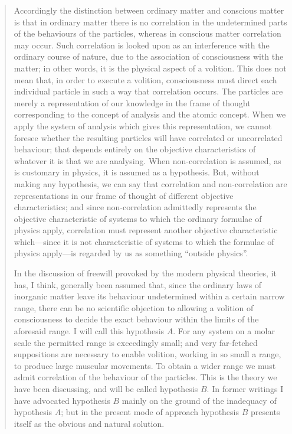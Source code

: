 \documentclass{article}
\begin{document}
\begin{quote}
    Accordingly the distinction between ordinary matter and conscious matter is that in ordinary matter there is no correlation in the undetermined parts of the behaviours of the particles, whereas in conscious matter correlation may occur.  Such correlation is looked upon as an interference with the ordinary course of nature, due to the association of consciousness with the matter; in other words, it is the physical aspect of a volition.  This does not mean that, in order to execute a volition, consciousness must direct each individual particle in such a way that correlation occurs.  The particles are merely a representation of our knowledge in the frame of thought corresponding to the concept of analysis and the atomic concept.  When we apply the system of analysis which gives this representation, we cannot foresee whether the resulting particles will have correlated or uncorrelated behaviour; that depends entirely on the objective characteristics of whatever it is that we are analysing.  When non-correlation is assumed, as is customary in physics, it is assumed as a hypothesis.  But, without making any hypothesis, we can say that correlation and non-correlation are representations in our frame of thought of different objective characteristics; and since non-correlation admittedly represents the objective characteristic of systems to which the ordinary formulae of physics apply, correlation must represent another objective characteristic which---since it is not characteristic of systems to which the formulae of physics apply---is regarded by us as something ``outside physics''.

    In the discussion of freewill provoked by the modern physical theories, it has, I think, generally been assumed that, since the ordinary laws of inorganic matter leave its behaviour undetermined within a certain narrow range, there can be no scientific objection to allowing a volition of consciousness to decide the exact behaviour within the limits of the aforesaid range.  I will call this hypothesis $A$.  For any system on a molar scale the permitted range is exceedingly small; and very far-fetched suppositions are necessary to enable volition, working in so small a range, to produce large muscular movements.  To obtain a wider range we must admit correlation of the behaviour of the particles.  This is the theory we have been discussing, and will be called hypothesis $B$.  In former writings I have advocated hypothesis $B$ mainly on the ground of the inadequacy of hypothesis $A$; but in the present mode of approach hypothesis $B$ presents itself as the obvious and natural solution.  


\end{quote}
\end{document}

